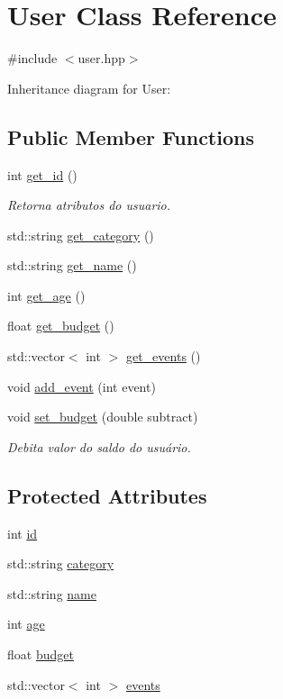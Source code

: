 \hypertarget{class_user}{}\section{User Class Reference}
\label{class_user}


{\ttfamily \#include $<$user.\+hpp$>$}



Inheritance diagram for User\+:
\subsection*{Public Member Functions}
\begin{DoxyCompactItemize}
\item 
int \hyperlink{class_user_a323f47279e29843406052a19bb2bf629}{get\+\_\+id} ()
\begin{DoxyCompactList}\small\item\em Retorna atributos do usuario. \end{DoxyCompactList}\item 
std\+::string \hyperlink{class_user_af6e35d86fcb3d6211330dcaac643a4d8}{get\+\_\+category} ()
\item 
std\+::string \hyperlink{class_user_a86c6040cbc76ac12c7f154b054bd1035}{get\+\_\+name} ()
\item 
int \hyperlink{class_user_ad797f0c5651a59713defd2f219c8f6d9}{get\+\_\+age} ()
\item 
float \hyperlink{class_user_a3dbc4e9226cf453c8b57a211dd4fe0d9}{get\+\_\+budget} ()
\item 
std\+::vector$<$ int $>$ \hyperlink{class_user_ad6132e4432e0c58debd3b9adf1783e4d}{get\+\_\+events} ()
\item 
void \hyperlink{class_user_a520082b4e1fa04c65d1a7b5075916e1f}{add\+\_\+event} (int event)
\item 
void \hyperlink{class_user_afd53679c08d593a54e8e03ec62aab9fd}{set\+\_\+budget} (double subtract)
\begin{DoxyCompactList}\small\item\em Debita valor do saldo do usuário. \end{DoxyCompactList}\end{DoxyCompactItemize}
\subsection*{Protected Attributes}
\begin{DoxyCompactItemize}
\item 
int \hyperlink{class_user_aa7e6e39b43020bbe9c3a196b3689b0f7}{id}
\item 
std\+::string \hyperlink{class_user_a4216a4a01d8b3b036de85c5238d79cea}{category}
\item 
std\+::string \hyperlink{class_user_a085d8d69282b6298964eab8351584536}{name}
\item 
int \hyperlink{class_user_aa5829689588d1f982e1a69b73bd68655}{age}
\item 
float \hyperlink{class_user_a9c4a23a62f53b4c1c289c27785a5868f}{budget}
\item 
std\+::vector$<$ int $>$ \hyperlink{class_user_a8c39751ae4641cbfea8c058a439e2cba}{events}
\end{DoxyCompactItemize}


